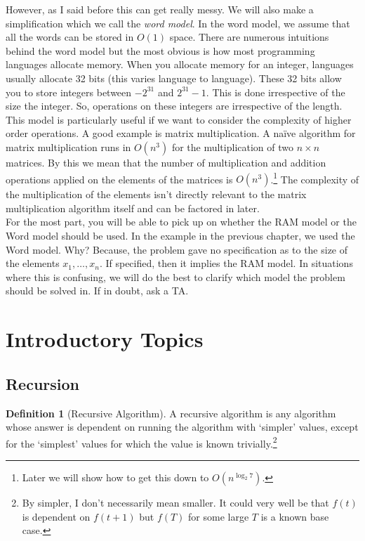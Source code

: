 \documentclass[11pt]{article}
\theoremstyle{plain}
\theoremstyle{definition}
\newtheorem{defn}[thm]{Definition} %
\numberwithin{equation}{section}
\numberwithin{figure}{section}
\begin{document}
\noindent However, as I said before this can get really messy. We will also make a simplification which we call the \emph{word model}. In the word model, we assume that all the words can be stored in $O(1)$ space. There are numerous intuitions behind the word model but the most obvious is how most programming languages allocate memory. When you allocate memory for an integer, languages usually allocate 32 bits (this varies language to language). These 32 bits allow you to store integers between $-2^{31}$ and $2^{31} - 1$. This is done irrespective of the size the integer. So, operations on these integers are irrespective of the length. \\

\noindent This model is particularly useful if we want to consider the complexity of higher order operations. A good example is matrix multiplication. A na\"ive algorithm for matrix multiplication runs in $O(n^3)$ for the multiplication of two $n \times n$ matrices. By this we mean that the number of multiplication and addition operations applied on the elements of the matrices is $O(n^3)$.\footnote{Later we will show how to get this down to $O(n^{\log_2 7})$.} The complexity of the multiplication of the elements isn't directly relevant to the matrix multiplication algorithm itself and can be factored in later. \\

\noindent For the most part, you will be able to pick up on whether the RAM model or the Word model should be used. In the example in the previous chapter, we used the Word model. Why? Because, the problem gave no specification as to the size of the elements $x_1, \ldots, x_n$. If specified, then it implies the RAM model. In situations where this is confusing, we will do the best to clarify which model the problem should be solved in. If in doubt, ask a TA.







\newpage
\section{Introductory Topics}

\subsection{Recursion}

\begin{defn}[Recursive Algorithm]
A recursive algorithm is any algorithm whose answer is dependent on running the algorithm with `simpler' values, except for the `simplest' values for which the value is known trivially.\footnote{By simpler, I don't necessarily mean smaller. It could very well be that $f(t)$ is dependent on $f(t + 1)$ but $f(T)$ for some large $T$ is a known base case.}
\end{defn}
\end{document}
